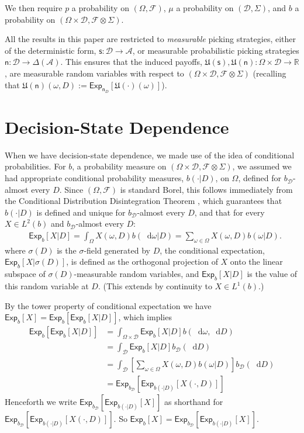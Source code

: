 \documentclass[a4paper,final]{article}
\newcommand\A{\mathcal{A}}
\newcommand\Exp{\mathsf{Exp}}
\newcommand\U{\mathfrak{U}} %
\newcommand{\Decs}{\mathcal{D}}
\newcommand\s{\mathsf{s}}
\newcommand{\n}{\mathsf{n}}
\renewcommand{\Re}{\mathbb{R}}
\renewcommand{\color}[1]{}
\newenvironment{colored}[1]{\leavevmode\color{#1}}{}
\newcommand*\diff{\mathop{}\!\mathrm{d}}
\newenvironment{CCM rewritten}
{\begingroup\color{blue}} %
{\endgroup}              %
\begin{document}
\begin{colored}{violet}
	We then require $p$ a probability on $(\Omega,\mathcal{F})$, $\mu$ a probability on $(\Decs,\Sigma)$, and $b$ a probability on $(\Omega\times\Decs,\mathcal{F}\otimes \Sigma)$.

	
	All the results in this paper are restricted to \emph{measurable} picking strategies, either of the deterministic form, $\s:\Decs\to\A$, or measurable probabilistic picking strategies $\n:\Decs\to\Delta(\A)$. This ensures that the induced payoffs, $\U(\s),\U(\n):\Omega\times\Decs\to\Re$, are measurable random variables with respect to $(\Omega\times\Decs,\mathcal{F}\otimes \Sigma)$ (recalling that $\U(\n)(\omega,D):=\Exp_{\n_D}[\U(\cdot)(\omega)]$). 
	

	
	
	
\section{Decision-State Dependence}\label{sect:appendix:decdep}


When we have decision-state dependence, we made use of the idea of conditional probabilities. For $b$, a probability measure on $(\Omega\times\Decs,\mathcal{F}\otimes \Sigma)$, we assumed we had appropriate conditional probability measures, $b(\cdot | D)$, on $\Omega$, defined for $b_\Decs$-almost every $D$. %
Since $(\Omega,\mathcal{F})$ is standard Borel, this follows immediately from the Conditional Distribution Disintegration Theorem \citep[Theorem 8.5]{kallenberg1997foundations}, which guarantees that $b(\cdot|D)$ is defined and unique for $b_\Decs$-almost every $D$, and that for every $X\in L^2(b)$ and $b_\Decs$-almost every $D$:
\begin{align}
	&\Exp_{b}[X | D] =\int_\Omega X(\omega,D)b(\diff \omega | D)=\sum_{\omega\in\Omega} X(\omega,D)b(\omega|D).
\end{align}
where $\sigma(D)$ is the $\sigma$-field generated by $D$, the conditional expectation, $\Exp_{b}[X | \sigma(D)]$, is defined as the orthogonal projection of $X$ onto the linear subspace of $\sigma(D)$-measurable random variables, and $\Exp_{b}[X | D]$ is the value of this random variable at $D$. (This extends by continuity to $X\in L^1(b)$.)

By the tower property of conditional expectation \citep[Theorem 8.1]{kallenberg1997foundations} we have $\Exp_b[X]=\Exp_{b}[\Exp_{b}[X | D]]$, which implies
\begin{align}
\Exp_{b}[\Exp_{b}[X | D]]&=\int_{\Omega\times \Decs} \Exp_{b}[X | D] b(\diff \omega, \diff D)\\
&=\int_{\Decs} \Exp_{b}[X | D] b_\Decs(\diff D)\\
&=\int_{\Decs} \left[\sum_{\omega\in\Omega} X(\omega,D)b(\omega|D)\right] b_\Decs(\diff D)\\
&=\Exp_{b_\Decs}[\Exp_{b(\cdot|D)}[X(\cdot, D)]]
\end{align}
Henceforth we write $\Exp_{b_\Decs}[\Exp_{b(\cdot|D)}[X]]$ as shorthand for $\Exp_{b_\Decs}[\Exp_{b(\cdot|D)}[X(\cdot, D)]]$. So $\Exp_b[X]=\Exp_{b_\Decs}[\Exp_{b(\cdot|D)}[X]]$.




\end{colored}
\end{document}
